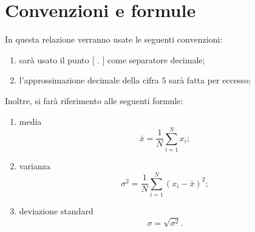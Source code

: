 \documentclass[10pt,oneside,a4paper]{article}
\begin{document}
\section{Convenzioni e formule}
In questa relazione verranno usate le seguenti convenzioni:
\begin{enumerate}
	\item sarà usato il punto [ $.$ ] come separatore decimale;
	\item l'approssimazione decimale della cifra $5$ sarà fatta per eccesso;
\end{enumerate}
Inoltre, si farà riferimento alle seguenti formule:
\begin{enumerate}
	\item media 
	\begin{equation}\label{eq:media}
	\bar{x} = \frac{1}{N}\sum_{i=1}^Nx_i;
	\end{equation}
	\item varianza
	\begin{equation}\label{eq:varianza}
	\sigma^2 = \frac{1}{N}\sum_{i=1}^N(x_i-\bar{x})^2;
	\end{equation}
	\item deviazione standard
	\begin{equation}\label{eq:deviazione}
	\sigma = \sqrt{\sigma^2}.
	\end{equation}	
\end{enumerate}

\end{document}
